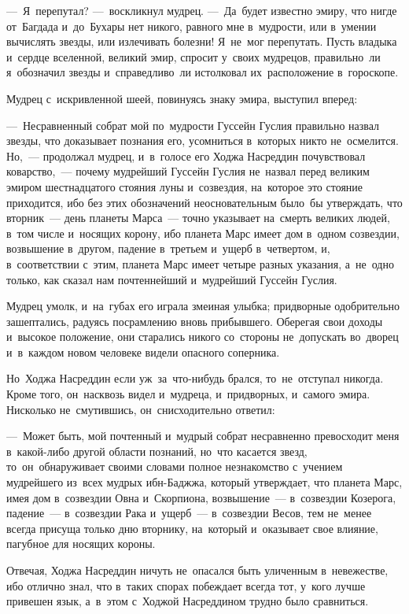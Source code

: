 \documentclass[12pt,a4paper]{book}
\begin{document}
—~Я~перепутал? —~воскликнул мудрец. —~Да~будет известно эмиру, что нигде от~Багдада и~до~Бухары нет никого, равного мне в~мудрости, или в~умении вычислять звезды, или излечивать болезни! Я~не~мог перепутать. Пусть владыка и~сердце вселенной, великий эмир, спросит у~своих мудрецов, правильно~ли я~обозначил звезды и~справедливо~ли истолковал их~расположение в~гороскопе.

Мудрец с~искривленной шеей, повинуясь знаку эмира, выступил вперед:

—~Несравненный собрат мой по~мудрости Гуссейн Гуслия правильно назвал звезды, что доказывает познания его, усомниться в~которых никто не~осмелится. Но,~— продолжал мудрец, и~в~голосе его Ходжа Насреддин почувствовал коварство,~— почему мудрейший Гуссейн Гуслия не~назвал перед великим эмиром шестнадцатого стояния луны и~созвездия, на~которое это стояние приходится, ибо без этих обозначений неосновательным было~бы утверждать, что вторник~— день планеты Марса~— точно указывает на~смерть великих людей, в~том числе и~носящих корону, ибо планета Марс имеет дом в~одном созвездии, возвышение в~другом, падение в~третьем и~ущерб в~четвертом, и, в~соответствии с~этим, планета Марс имеет четыре разных указания, а~не~одно только, как сказал нам почтеннейший и~мудрейший Гуссейн Гуслия.

Мудрец умолк, и~на~губах его играла змеиная улыбка; придворные одобрительно зашептались, радуясь посрамлению вновь прибывшего. Оберегая свои доходы и~высокое положение, они старались никого со~стороны не~допускать во~дворец и~в~каждом новом человеке видели опасного соперника.

Но~Ходжа Насреддин если уж~за~что-нибудь брался, то~не~отступал никогда. Кроме того, он~насквозь видел и~мудреца, и~придворных, и~самого эмира. Нисколько не~смутившись, он~снисходительно ответил:

—~Может быть, мой почтенный и~мудрый собрат несравненно превосходит меня в~какой-либо другой области познаний, но~что касается звезд, то~он~обнаруживает своими словами полное незнакомство с~учением мудрейшего из~всех мудрых ибн-Баджжа, который утверждает, что планета Марс, имея дом в~созвездии Овна и~Скорпиона, возвышение~— в~созвездии Козерога, падение~— в~созвездии Рака и~ущерб~— в~созвездии Весов, тем не~менее всегда присуща только дню вторнику, на~который и~оказывает свое влияние, пагубное для носящих короны.

Отвечая, Ходжа Насреддин ничуть не~опасался быть уличенным в~невежестве, ибо отлично знал, что в~таких спорах побеждает всегда тот, у~кого лучше привешен язык, а~в~этом с~Ходжой Насреддином трудно было сравниться.
\end{document}
